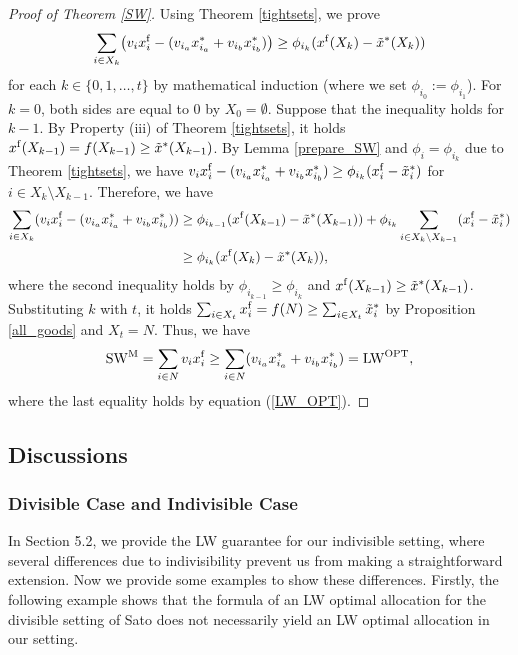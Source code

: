 \documentclass[letterpaper,11pt]{article}
\begin{document}
	\begin{proof}[Proof of Theorem \ref{SW}]
	Using Theorem \ref{tightsets}, we prove 
	\[
	\sum_{i\in X_{k}} \bigl(v_i x^{\rm f}_i-
	(v_{i_{a}} x^*_{i_{a}}+v_{i_{b}} x^*_{i_{b}})\bigr)
	\geq \phi_{i_k} (x^{\rm f}(X_k)-\tilde{x}^*(X_k))
	\]
	for each $k\in \{0,1,\ldots,t\}$ by mathematical induction (where we set $\phi_{i_0}:=\phi_{i_1}$). 
	For $k=0$, both sides are equal to $0$ by $X_0=\emptyset$.
	Suppose that the inequality holds for $k-1$.
	By Property (iii) of Theorem \ref{tightsets}, it holds $x^{\rm f}(X_{k-1})=f(X_{k-1})\geq \tilde{x}^*(X_{k-1})$.
	By Lemma \ref{prepare_SW} and $\phi_i=\phi_{i_k}$ 
	due to Theorem \ref{tightsets}, we have 
	$v_i x^{\rm f}_i-(v_{i_{a}} x^*_{i_{a}}+v_{i_{b}} x^*_{i_{b}})\geq \phi_{i_k}(x^{\rm f}_i-\tilde{x}^*_{i})$ 
	for $i\in X_{k}\setminus X_{k-1}$.
	Therefore, we have
	\begin{align*}
	\sum_{i\in X_{k}} (v_i x^{\rm f}_i- (v_{i_{a}} x^*_{i_{a}}+v_{i_{b}} x^*_{i_{b}}))&\geq \phi_{i_{k-1}} (x^{\rm f}(X_{k-1})-\tilde{x}^*(X_{k-1}))+
	 \phi_{i_k}\sum_{i\in X_{k}\setminus X_{k-1}}(x^{\rm f}_i- \tilde{x}^*_{i})\\ 
	&\geq \phi_{i_{k}} (x^{\rm f}(X_{k})-\tilde{x}^*(X_{k})), 
	\end{align*}
	where the second inequality holds by $\phi_{i_{k-1}}\geq \phi_{i_{k}}$ and $x^{\rm f}(X_{k-1})\geq \tilde{x}^*(X_{k-1})$.
	Substituting $k$ with $t$, it holds $\sum_{i\in X_t}x^{\rm f}_i=f(N)\geq \sum_{i\in X_t} \tilde{x}^*_{i}$
	by Proposition \ref{all_goods} and $X_t=N$. Thus, we have 
	\[
	{\rm SW}^{\rm M}=\sum_{i\in N}v_i x^{\rm f}_i \geq \sum_{i\in N} (v_{i_{a}} x^*_{i_{a}}+v_{i_{b}} x^*_{i_{b}})={\rm LW}^{\rm OPT},
	\] 
	where the last equality holds by equation (\ref{LW_OPT}).
	
	\end{proof}


\subsection{Discussions}
\subsubsection{Divisible Case and Indivisible Case}

In Section 5.2, we provide the LW guarantee for our indivisible setting, 
where several differences due to indivisibility prevent us from making a straightforward extension.
Now we provide some examples to show these differences.
Firstly, the following example shows that the formula of an LW optimal allocation for the divisible setting of Sato \cite{S2023} 
does not necessarily yield an LW optimal allocation in our setting.
\end{document}
